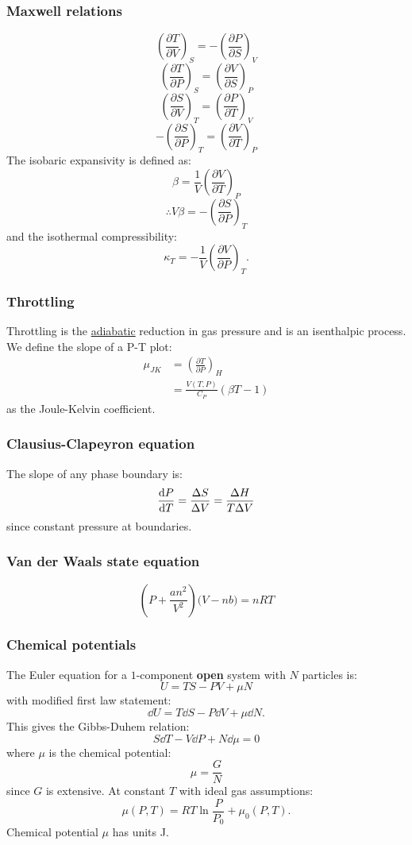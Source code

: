 \documentclass{article}
\begin{document}
\begin{multicols*}{3}
\subsubsection*{Maxwell relations}
$$\left(\frac{\partial T}{\partial V}\right)_S
=-\left(\frac{\partial P}{\partial S}\right)_V$$
$$\left(\frac{\partial T}{\partial P}\right)_S
=\left(\frac{\partial V}{\partial S}\right)_P$$
$$\left(\frac{\partial S}{\partial V}\right)_T
=\left(\frac{\partial P}{\partial T}\right)_V$$
$$-\left(\frac{\partial S}{\partial P}\right)_T
=\left(\frac{\partial V}{\partial T}\right)_P$$
The isobaric expansivity is defined as:
$$\beta=\frac{1}{V}
\left(\frac{\partial V}{\partial T}\right)_P$$
$$\therefore V\beta=
-\left(\frac{\partial S}{\partial P}\right)_T$$
and the isothermal compressibility:
$$\kappa_T=-\frac{1}{V}
\left(\frac{\partial V}{\partial P}\right)_T.$$

\subsubsection*{Throttling}
Throttling is the \underline{adiabatic} 
reduction in gas pressure
and is an isenthalpic process.
We define
the slope of a P-T plot:
\begin{align*}
    \mu_{JK}&=\left(
    \frac{\partial T}{\partial P}\right)_H \\
    &=\frac{V(T,P)}{C_P}(\beta T-1)
\end{align*}
as the
Joule-Kelvin coefficient.

\subsubsection*{Clausius-Clapeyron equation}
The slope of any phase boundary is:
$$\dv{P}{T}=\frac{\Delta S}{\Delta V}
=\frac{\Delta H}{T\Delta V}$$
since constant pressure at boundaries.

\subsubsection*{Van der Waals state equation}
$$\left(P+\frac{an^2}{V^2}\right)
\bigl(V-nb\bigr)=nRT$$

\subsubsection*{Chemical potentials}
The Euler equation for a $1$-component
\textbf{open} system with
$N$ particles is:
$$U=TS-PV+\mu N$$
with modified first law statement: 
$$\dd U
=T\dd S-P\dd V+\mu\dd N.$$
This gives the Gibbs-Duhem relation:
$$S\dd T-V\dd P+N\dd\mu=0$$
where $\mu$ is the chemical potential:
$$\mu=\frac{G}{N}$$
since $G$ is extensive. At constant $T$
with ideal gas assumptions:
$$\mu(P,T)=RT\ln\frac{P}{P_0}+\mu_0(P,T).$$
Chemical potential $\mu$ has units J.


\end{multicols*}
\end{document}
